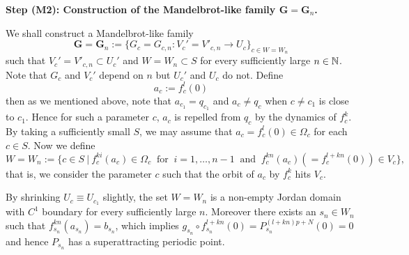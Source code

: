 \vskip 2mm


\noin
{\bf Step (M2): Construction of the Mandelbrot-like family 
$\boldsymbol{G} = \boldsymbol{G}_n$.} \ 

We shall construct a Mandelbrot-like family 
$$
\boldsymbol{G} = \boldsymbol{G}_n 
:= 
\{ G_c=G_{c, n} : V_c'=V'_{c,n} \to U_c 
   \}_{c \in W=W_n} 
$$
such that $V_c'=V'_{c,n} \subset U_c'$ and $W = W_n \subset S$ for every
sufficiently large $n \in \mathbb N$. Note that $G_c$ and $V_c'$ depend on $n$ 
but $U_c'$ and $U_c$ do not. 
Define
$$
  a_c := f_c^l(0)
$$
then as we mentioned above, note that $a_{c_1} = q_{c_1}$ and $a_c \ne q_c$
when $c \ne c_1$ is close to $c_1$.  Hence for such a parameter $c$,  
$a_c$ is repelled from $q_c$ by the dynamics of $f_c^k$. 
By taking a sufficiently small $S$, we may assume that 
$a_c = f_c^l(0) \in \Omega_c$
for each $c \in S$. Now we define
$$
W = W_n 
:= 
\{ c \in S \ | \ f_c^{ki}(a_c) \in \Omega_c \ \text{ for } \ i=1, \dots, n-1
\ \text{ and } \ 
   f_c^{kn}(a_c) (= f_c^{l+kn}(0)) \in V_c \}, 
$$
that is, we consider the parameter $c$ such that the orbit of $a_c$ by $f_c^k$
hits $V_c$.



\begin{lem}
By shrinking $U_c \equiv U_{c_1}$ slightly, the set $W=W_n$ is a non-empty
Jordan domain with $C^1$ boundary for every 
sufficiently large $n$. Moreover there exists an $s_n \in W_n$ such that 
$f_{s_n}^{kn}(a_{s_n}) = b_{s_n}$, which implies
$g_{s_n} \circ f_{s_n}^{l+kn}(0) = P_{s_n}^{(l+kn)p+N}(0) = 0$ and hence
$P_{s_n}$ has a superattracting periodic point. 
\label{W_n is not empty}
\end{lem}


